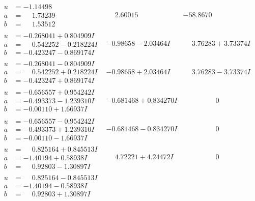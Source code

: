 \documentclass[1p]{elsarticle_modified}
\theoremstyle{definition}
\begin{document}
$$\begin{array}{c|c|c}
\begin{aligned}
u &= -1.14498\phantom{ +0.000000I} \\
a &= \phantom{-}1.73239\phantom{ +0.000000I} \\
b &= \phantom{-}1.53512\phantom{ +0.000000I}\end{aligned}
 & \phantom{-}2.60015\phantom{ +0.000000I} & -58.8670\phantom{ +0.000000I} \\ \hline\begin{aligned}
u &= -0.268041 + 0.804909 I \\
a &= \phantom{-}0.542252 - 0.218224 I \\
b &= -0.423247 - 0.869174 I\end{aligned}
 & -0.98658 - 2.03464 I & \phantom{-}3.76283 + 3.73374 I \\ \hline\begin{aligned}
u &= -0.268041 - 0.804909 I \\
a &= \phantom{-}0.542252 + 0.218224 I \\
b &= -0.423247 + 0.869174 I\end{aligned}
 & -0.98658 + 2.03464 I & \phantom{-}3.76283 - 3.73374 I \\ \hline\begin{aligned}
u &= -0.656557 + 0.954242 I \\
a &= -0.493373 - 1.239310 I \\
b &= -0.00110 + 1.66937 I\end{aligned}
 & -0.681468 + 0.834270 I & \phantom{-0.000000 } 0 \\ \hline\begin{aligned}
u &= -0.656557 - 0.954242 I \\
a &= -0.493373 + 1.239310 I \\
b &= -0.00110 - 1.66937 I\end{aligned}
 & -0.681468 - 0.834270 I & \phantom{-0.000000 } 0 \\ \hline\begin{aligned}
u &= \phantom{-}0.825164 + 0.845513 I \\
a &= -1.40194 + 0.58938 I \\
b &= \phantom{-}0.92803 - 1.30897 I\end{aligned}
 & \phantom{-}4.72221 + 4.24472 I & \phantom{-0.000000 } 0 \\ \hline\begin{aligned}
u &= \phantom{-}0.825164 - 0.845513 I \\
a &= -1.40194 - 0.58938 I \\
b &= \phantom{-}0.92803 + 1.30897 I\end{aligned}

\end{array}$$
\end{document}
